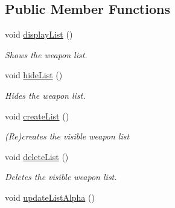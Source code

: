 \subsection*{\-Public \-Member \-Functions}
\begin{DoxyCompactItemize}
\item 
\hypertarget{classWeaponInventory_afe9ad216841e201c857a8b7d525e183d}{
void \hyperlink{classWeaponInventory_afe9ad216841e201c857a8b7d525e183d}{display\-List} ()}
\label{d8/da9/classWeaponInventory_afe9ad216841e201c857a8b7d525e183d}

\begin{DoxyCompactList}\small\item\em \-Shows the weapon list. \end{DoxyCompactList}\item 
\hypertarget{classWeaponInventory_aa9745377e5eedd0bf4193bca6134cbeb}{
void \hyperlink{classWeaponInventory_aa9745377e5eedd0bf4193bca6134cbeb}{hide\-List} ()}
\label{d8/da9/classWeaponInventory_aa9745377e5eedd0bf4193bca6134cbeb}

\begin{DoxyCompactList}\small\item\em \-Hides the weapon list. \end{DoxyCompactList}\item 
\hypertarget{classWeaponInventory_adc48c0bd9bcbec0a0b2d95edbec10821}{
void \hyperlink{classWeaponInventory_adc48c0bd9bcbec0a0b2d95edbec10821}{create\-List} ()}
\label{d8/da9/classWeaponInventory_adc48c0bd9bcbec0a0b2d95edbec10821}

\begin{DoxyCompactList}\small\item\em (\-Re)creates the visible weapon list \end{DoxyCompactList}\item 
\hypertarget{classWeaponInventory_a5ff0102ab3fe322c493b65309b067da4}{
void \hyperlink{classWeaponInventory_a5ff0102ab3fe322c493b65309b067da4}{delete\-List} ()}
\label{d8/da9/classWeaponInventory_a5ff0102ab3fe322c493b65309b067da4}

\begin{DoxyCompactList}\small\item\em \-Deletes the visible weapon list. \end{DoxyCompactList}\item 
\hypertarget{classWeaponInventory_a9a3795501043232ac18430abc4e1c29d}{
void \hyperlink{classWeaponInventory_a9a3795501043232ac18430abc4e1c29d}{update\-List\-Alpha} ()}
\label{d8/da9/classWeaponInventory_a9a3795501043232ac18430abc4e1c29d}


\end{DoxyCompactItemize}
